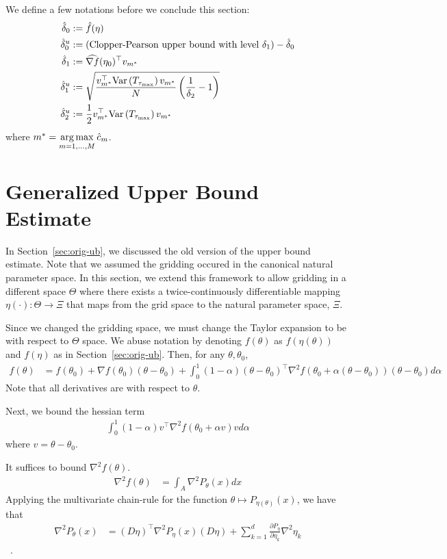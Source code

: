 \documentclass[10pt]{article}
\begin{document}
We define a few notations before we conclude this section:
\begin{align*}
    \hat{\delta}_0 &:= \hat{f}(\eta) \\
    \hat{\delta}_0^u &:= \text{(Clopper-Pearson upper bound with level $\delta_1$)} - \hat{\delta}_0 \\
    \hat{\delta}_1 &:= \widehat{\nabla f}(\eta_0)^\top v_{m^*} \\
    \hat{\delta}_1^u &:= \sqrt{%
        \frac{v_{m^*}^\top \var{T_{\tau_{\max}}} v_{m^*}}{N} 
        \paren{\frac{1}{\delta_2}-1}
    } \\
    \hat{\delta}_2^u &:= \frac{1}{2} 
    v_{m^*}^\top \var{T_{\tau_{\max}}} v_{m^*}
\end{align*}
where $m^* = \operatorname*{arg\,max}\limits_{m=1,\ldots, M} \hat{c}_m$.

\section{Generalized Upper Bound Estimate}\label{sec:gen-ub}

In Section~\ref{sec:orig-ub}, we discussed the old version of the upper bound estimate.
Note that we assumed the gridding occured in the canonical natural parameter space.
In this section, we extend this framework to allow gridding in a different space $\Theta$
where there exists a twice-continuously differentiable mapping $\eta(\cdot) : \Theta \to \Xi$
that maps from the grid space to the natural parameter space, $\Xi$.

Since we changed the gridding space, we must change the Taylor expansion
to be with respect to $\Theta$ space.
We abuse notation by denoting $f(\theta)$ as $f(\eta(\theta))$
and $f(\eta)$ as in Section~\ref{sec:orig-ub}.
Then, for any $\theta, \theta_0$,
\begin{align*}
    f(\theta)
    &=
    f(\theta_0)
    +
    \nabla f(\theta_0) (\theta - \theta_0)
    +
    \int_0^1 (1-\alpha) 
    (\theta-\theta_0)^\top
    \nabla^2 f(\theta_0 + \alpha (\theta-\theta_0))
    (\theta-\theta_0)
    d\alpha
\end{align*}
Note that all derivatives are with respect to $\theta$.

Next, we bound the hessian term
\begin{align*}
    \int_0^1 (1-\alpha) v^\top \nabla^2 f(\theta_0 + \alpha v) v d\alpha
\end{align*}
where $v = \theta-\theta_0$.

It suffices to bound $\nabla^2 f(\theta)$.
\begin{align*}
    \nabla^2 f(\theta)
    &=
    \int_A \nabla^2 P_\theta(x) dx
\end{align*}
Applying the multivariate chain-rule for the function
$\theta \mapsto P_{\eta(\theta)}(x)$,
we have that
\begin{align*}
    \nabla^2 P_\theta(x)
    &=
    (D\eta)^\top \nabla^2 P_\eta(x) (D\eta)
    + 
    \sum\limits_{k=1}^d 
    \frac{\partial P_\eta}{\partial \eta_k}
    \nabla^2 \eta_k
\end{align*}
~\cite{skorski:2019:hess}.
\end{document}
